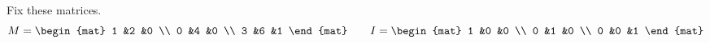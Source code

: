 \documentclass[answers, nolegalese, 11pt]{examjh}
\begin{document}
\thispagestyle{empty}
\vspace{-1ex}
\makebox[\textwidth]{\hbox{}\hrulefill\hbox{}}

Fix these matrices.
\begin{equation*}
  M=
  \begin{mat}
    1  &2  &0  \\
    0  &4  &0  \\
   3   &6  &1
  \end{mat}
 \qquad
 I=
 \begin{mat}
 1  &0  &0  \\
 0  &1  &0  \\
 0  &0  &1
 \end{mat}
\end{equation*}
\end{document}
